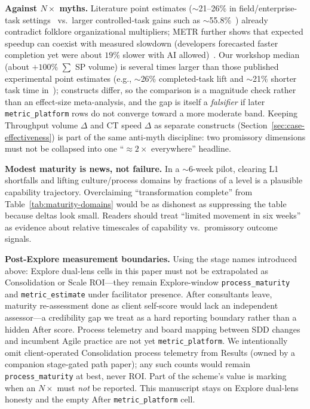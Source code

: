 \documentclass[10pt,conference]{IEEEtran}
\begin{document}
\textbf{Against $N\times$ myths.}
Literature point estimates ($\sim$21--26\% in field/enterprise-task settings~\cite{Cui2026GenAIField,Paradis2024GoogleAISpeed} vs.\ larger controlled-task gains such as $\sim$55.8\%~\cite{Peng2023Copilot}) already contradict folklore organizational multipliers; METR further shows that expected speedup can coexist with measured slowdown (developers forecasted faster completion yet were about $19\%$ slower with AI allowed)~\cite{METR2025AIProductivity}.
Our workshop median (about $+100\%$ $\sum$ SP volume) is several times larger than those published experimental point estimates (e.g., $\sim$26\% completed-task lift and $\sim$21\% shorter task time in~\cite{Cui2026GenAIField,Paradis2024GoogleAISpeed}); constructs differ, so the comparison is a magnitude check rather than an effect-size meta-analysis, and the gap is itself a \emph{falsifier} if later \texttt{metric\_platform} rows do not converge toward a more moderate band.
Keeping Throughput volume $\Delta$ and CT speed $\Delta$ as separate constructs (Section~\ref{sec:case-effectiveness}) is part of the same anti-myth discipline: two promissory dimensions must not be collapsed into one ``$\approx 2\times$ everywhere'' headline.

\textbf{Modest maturity is news, not failure.}
In a $\sim$6-week pilot, clearing L1 shortfalls and lifting culture/process domains by fractions of a level is a plausible capability trajectory.
Overclaiming ``transformation complete'' from Table~\ref{tab:maturity-domains} would be as dishonest as suppressing the table because deltas look small.
Readers should treat ``limited movement in six weeks'' as evidence about relative timescales of capability vs.\ promissory outcome signals.

\textbf{Post-Explore measurement boundaries.}
Using the stage names introduced above: Explore dual-lens cells in this paper must not be extrapolated as Consolidation or Scale ROI---they remain Explore-window \texttt{process\_maturity} and \texttt{metric\_estimate} under facilitator presence.
After consultants leave, maturity re-assessment done as client self-score would lack an independent assessor---a credibility gap we treat as a hard reporting boundary rather than a hidden After score.
Process telemetry and board mapping between SDD changes and incumbent Agile practice are not yet \texttt{metric\_platform}.
We intentionally omit client-operated Consolidation process telemetry from Results (owned by a companion stage-gated path paper); any such counts would remain \texttt{process\_maturity} at best, never ROI.
Part of the scheme's value is marking when an $N\times$ must \emph{not} be reported.
This manuscript stays on Explore dual-lens honesty and the empty After \texttt{metric\_platform} cell.
\end{document}
